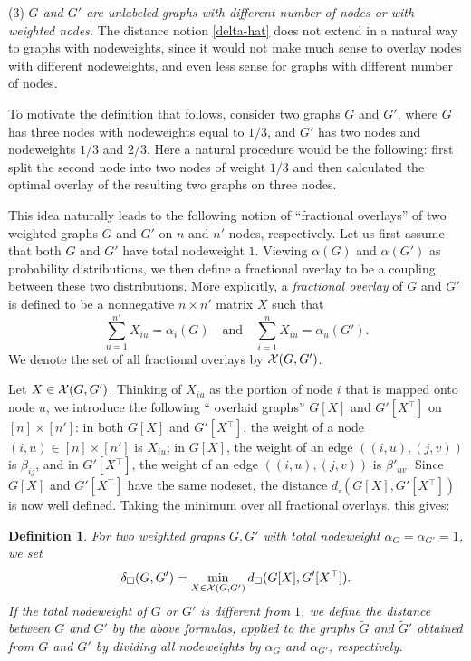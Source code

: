 \documentclass[12pt]{article}
\newtheorem{definition}[theorem]{Definition}
\numberwithin{equation}{section}
\def\T{{^\top}}
\begin{document}
\smallskip

(3) {\it $G$ and $G'$ are unlabeled graphs with different number of
nodes or with weighted nodes.} The distance notion \eqref{delta-hat}
does not extend in a natural way to graphs with nodeweights, since
it would not make much sense to overlay nodes with different
nodeweights, and even less
sense for graphs with different number of nodes.

To motivate the definition that follows, consider two graphs $G$ and
$G'$, where $G$ has three nodes with nodeweights equal to $1/3$, and
$G'$ has two nodes and nodeweights $1/3$ and $2/3$. Here a natural
procedure would be the following: first split the second node into
two nodes of weight $1/3$ and then calculated the optimal overlay of
the resulting two graphs on three nodes.

This idea naturally leads to the following notion of ``fractional
overlays'' of two weighted graphs $G$ and $G'$ on $n$ and $n'$ nodes,
respectively. Let us first assume that both $G$ and $G'$ have total
nodeweight $1$. Viewing $\alpha(G)$ and $\alpha(G')$ as probability
distributions, we then define a fractional overlay to be a coupling
between these two distributions. More explicitly, a {\it fractional
overlay} of $G$ and $G'$ is defined to be a nonnegative $n\times n'$
matrix $X$ such that
\[
\sum_{u=1}^{n'} X_{iu}=\alpha_i(G) \quad\text{and}\quad \sum_{i=1}^n
X_{iu}=\alpha_u(G').
\]
We denote the set of all fractional overlays by
${\cal X}(G,G')$.

Let $X\in{\cal X}(G,G')$. Thinking of $X_{iu}$ as the portion of node $i$
that is mapped onto node $u$, we introduce the following ``
overlaid
graphs'' $G[X]$ and $G'[X\T]$  on $[n]\times[ n']$: in both $G[X]$
and $G'[X\T]$, the weight of a node $(i,u)\in [n]\times[ n']$ is
$X_{iu}$; in $G[X]$, the weight of an edge $((i,u),(j,v))$ is
$\beta_{ij}$, and in  $G'[X\T]$, the weight of an edge
$((i,u),(j,v))$ is $\beta'_{uv}$. Since $G[X]$ and $G'[X\T]$ have the
same nodeset, the distance $d_\square(G[X], G'[X\T])$ is now well
defined. Taking the minimum over all fractional overlays, this gives:

\begin{definition}
For two weighted graphs $G,G'$ with total nodeweight
$\alpha_G=\alpha_{G'}=1$, we set
\begin{equation}
\label{delta-altdef} \delta_\square(G,G')=\min_{X\in \XX(G,G')}
d_\square(G[X], G'[X\T]).
\end{equation}
If the total nodeweight of $G$ or $G'$ is different from $1$, we
define the distance between $G$ and $G'$ by the above formulas,
applied to the graphs $\tilde G$ and $\tilde G'$ obtained from $G$
and $G'$ by dividing all nodeweights by $\alpha_G$ and $\alpha_{G'}$,
respectively.
\end{definition}
\end{document}
